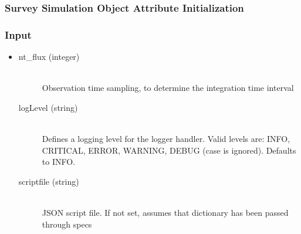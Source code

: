 \documentclass[cleanfoot]{asme2ej}
\begin{document}
\subsubsection{Survey Simulation Object Attribute Initialization}

\subsubsection*{Input}
\begin{itemize}
\item 
\begin{description}
    \item[nt\_flux (integer)] \hfill \\ Observation time sampling, to determine the integration time interval
    \item[logLevel (string)] \hfill \\ Defines a logging level for the logger handler. Valid levels are: INFO, CRITICAL, ERROR, WARNING, DEBUG (case is ignored). Defaults to INFO.
    \item[scriptfile (string)] \hfill \\ JSON script file.  If not set, assumes that dictionary has been passed through specs 
\end{description}
\end{itemize}
\end{document}
